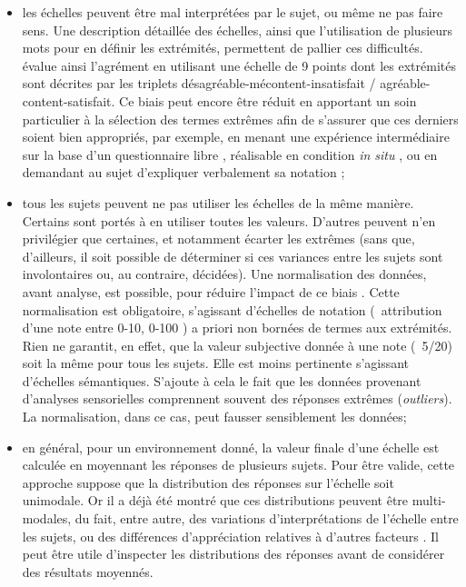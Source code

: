 \begin{itemize}
\item les échelles peuvent être mal interprétées par le sujet, ou même ne pas faire sens. Une description détaillée des échelles, ainsi que l'utilisation de plusieurs mots pour en définir les extrémités, permettent de pallier ces difficultés. \citep{hall2013exploratory} évalue ainsi l'agrément en utilisant une échelle de 9 points dont les extrémités sont décrites par les triplets désagréable-mécontent-insatisfait / agréable-content-satisfait. Ce biais peut encore être réduit en apportant un soin particulier à la sélection des termes extrêmes afin de s'assurer que ces derniers soient bien appropriés, par exemple, en menant une expérience intermédiaire sur la base d'un questionnaire libre \citep{guastavino2004perceptual}, réalisable en condition \emph{in situ} \citep{kang2010semantic,hong2013designing}, ou en demandant au sujet d'expliquer verbalement sa notation \citep{raimbault2006qualitative};
\item tous les sujets peuvent ne pas utiliser les échelles de la même manière. Certains sont portés à en utiliser toutes les valeurs. D'autres peuvent n'en privilégier que certaines, et notamment écarter les extrêmes (sans que, d'ailleurs, il soit possible de déterminer si ces variances entre les sujets sont involontaires ou, au contraire, décidées). Une normalisation des données, avant analyse, est possible, pour réduire l'impact de ce biais \citep{defreville2004aactivity,lavandier2006contribution,nielbo2013investigating,hong2013designing}. Cette normalisation est obligatoire, s'agissant d'échelles de notation (\eg~attribution d'une note entre 0-10, 0-100 \etc) a priori non bornées de termes aux extrémités. Rien ne garantit, en effet, que la valeur subjective donnée à une note (\eg~5/20) soit la même pour tous les sujets. Elle est moins pertinente s'agissant d'échelles sémantiques. S'ajoute à cela le fait que les données provenant d'analyses sensorielles comprennent souvent des réponses extrêmes (\emph{outliers}). La normalisation, dans ce cas, peut fausser sensiblement les données;

\item en général, pour un environnement donné, la valeur finale d'une échelle est calculée en moyennant les réponses de plusieurs sujets. Pour être valide, cette approche suppose que la distribution des réponses sur l'échelle soit unimodale. Or il a déjà été montré que ces distributions peuvent être multi-modales, du fait, entre autre, des variations d'interprétations de l'échelle entre les sujets, ou des différences d'appréciation relatives à d'autres facteurs \citep{raimbault2006qualitative}. Il peut être utile d'inspecter les distributions des réponses avant de considérer des résultats moyennés.

\end{itemize}

